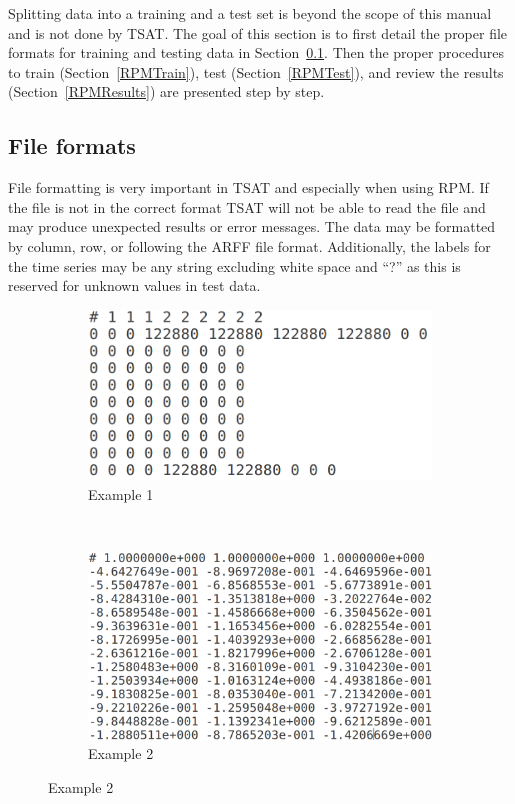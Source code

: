 \documentclass[letterpaper, 12pt]{article}
\begin{document}
Splitting data into a training and a test set is beyond the scope of this manual and is not done by TSAT. The goal of this section is to first detail the proper file formats for training and testing data in Section~\ref{RPMFile}. Then the proper procedures to train (Section~\ref{RPMTrain}), test (Section~\ref{RPMTest}), and review the results (Section~\ref{RPMResults}) are presented step by step. 

\subsection{File formats}
\label{RPMFile}
File formatting is very important in TSAT and especially when using RPM.  If the file is not in the correct format TSAT will not be able to read the file and may produce unexpected results or error messages.  The data may be formatted by column, row, or following the ARFF file format. Additionally, the labels for the time series may be any string excluding white space and ``?'' as this is reserved for unknown values in test data.

\begin{figure}[h]
	\caption{Examples of RPM Data}
	\label{fig:rpm-data-exs}
	\begin{subfigure}[b]{0.5\textwidth}
		\includegraphics[width=\textwidth]{rpm_data_example_1}
		\caption{Example 1}
		\label{fig:rpm-data-ex-1}
	\end{subfigure}
	~
	\begin{subfigure}[b]{0.5\textwidth}
		\includegraphics[width=\textwidth]{rpm_data_example_2}
		\caption{Example 2}
		\label{fig:rpm-data-ex-2}
	\end{subfigure}
\end{figure}
\end{document}
